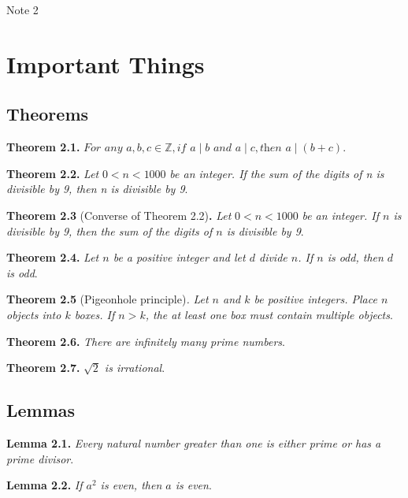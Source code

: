 \documentclass[12pt,a4paper]{article}
\begin{document}
\raggedright

\begin{center}
	\huge{Note 2}
\end{center}

\section*{Important Things}

\subsection*{Theorems}

\textbf{Theorem 2.1.} $\textit{For any } a,b,c \in \mathbb{Z}, \textit{if } a\mid b \textit{ and } a\mid c, \textit{then } a\mid (b+c)$.

\bigbreak

\textbf{Theorem 2.2.} \textit{Let} $0<n<1000$ \textit{be an integer. If the sum of the digits of n is divisible by 9, then n is divisible by 9}.

\bigbreak

\textbf{Theorem 2.3} (Converse of Theorem 2.2)\textbf{.} \textit{Let} $0<n<1000$ \textit{be an integer. If $n$ is divisible by 9, then the sum of the digits of $n$ is divisible by 9}.

\bigbreak

\textbf{Theorem 2.4.} \textit{Let $n$ be a positive integer and let $d$ divide $n$. If $n$ is odd, then $d$ is odd}.

\bigbreak

\textbf{Theorem 2.5} (Pigeonhole principle)\textit{.} \textit{Let $n$ and $k$ be positive integers. Place $n$ objects into $k$ boxes. If $n>k$, the at least one box must contain multiple objects}.

\bigbreak

\textbf{Theorem 2.6.} \textit{There are infinitely many prime numbers}.

\bigbreak

\textbf{Theorem 2.7.} \textit{$\sqrt{2}$ is irrational}.

\subsection*{Lemmas}

\textbf{Lemma 2.1.} \textit{Every natural number greater than one is either prime or has a prime divisor}.

\bigbreak

\textbf{Lemma 2.2.} \textit{If $a^2$ is even, then $a$ is even}.
\end{document}
